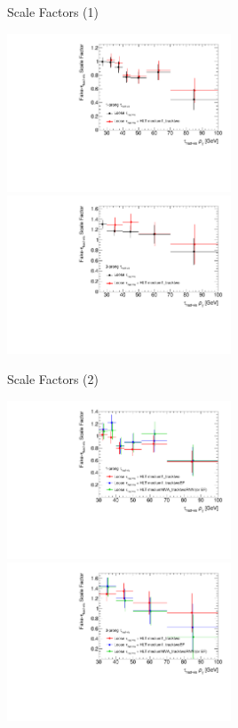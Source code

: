 \documentclass[11pt, xcolor={dvipsnames}, aspectratio=169, notes]{beamer}
\begin{document}

\begin{frame}{Scale Factors (1)}
  \centering

  \includegraphics[width=0.5\textwidth]{ttbarSF/ttbarSF_offl_tau25_1p}%
  \includegraphics[width=0.5\textwidth]{ttbarSF/ttbarSF_offl_tau25_3p}
\end{frame}


\begin{frame}{Scale Factors (2)}
  \centering

  \includegraphics[width=0.5\textwidth]{ttbarSF/ttbarSF_tau25_1p}%
  \includegraphics[width=0.5\textwidth]{ttbarSF/ttbarSF_tau25_3p}
\end{frame}
\end{document}
